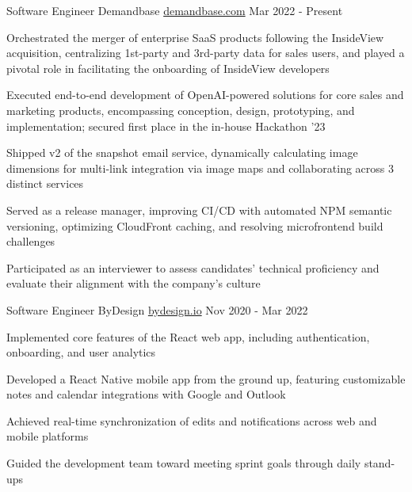 

\begin{cventries}

\cventry
{Software Engineer} %
{Demandbase} %
{\href{https://www.demandbase.com/}{demandbase.com}} %
{Mar 2022 - Present} %
{
  \begin{cvitems} %
    \item {Orchestrated the merger of enterprise SaaS products following the InsideView acquisition, centralizing 1st-party and 3rd-party data for sales users, and played a pivotal role in facilitating the onboarding of InsideView developers}
    \item {Executed end-to-end development of OpenAI-powered solutions for core sales and marketing products, encompassing conception, design, prototyping, and implementation; secured first place in the in-house Hackathon '23}
    \item {Shipped v2 of the snapshot email service, dynamically calculating image dimensions for multi-link integration via image maps and collaborating across 3 distinct services}
    \item {Served as a release manager, improving CI/CD with automated NPM semantic versioning, optimizing CloudFront caching, and resolving microfrontend build challenges}
    \item {Participated as an interviewer to assess candidates' technical proficiency and evaluate their alignment with the company's culture}
  \end{cvitems}
}

\cventry
{Software Engineer} %
{ByDesign} %
{\href{https://bydesign.io}{bydesign.io}} %
{Nov 2020 - Mar 2022} %
{
  \begin{cvitems} %
    \item {Implemented core features of the React web app, including authentication, onboarding, and user analytics}
    \item {Developed a React Native mobile app from the ground up, featuring customizable notes and calendar integrations with Google and Outlook}
    \item {Achieved real-time synchronization of edits and notifications across web and mobile platforms}
    \item {Guided the development team toward meeting sprint goals through daily stand-ups}
  \end{cvitems}
}


\end{cventries}
